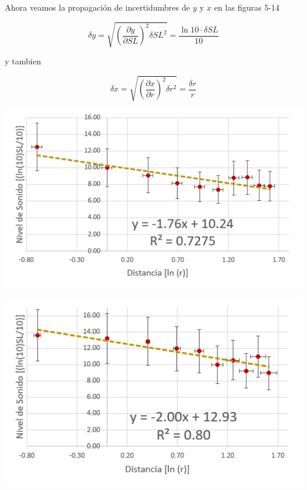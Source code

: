 \documentclass[DIV=calc, paper=a4, fontsize=11pt]{scrartcl}
\newenvironment{Figura}
  {\par\medskip\noindent\minipage{\linewidth}}
  {\endminipage\par\medskip}
\begin{document}
\begin{multicols}{2}
Ahora veamos la propagación de incertidumbres de $y$ y $x$ en las figuras 5-14

\begin{equation*}
    \delta y = \sqrt{\left(\frac{\partial y}{\partial SL}\right)^2 \delta SL^2 } = \frac{\ln{10} \cdot \delta SL}{10}
\end{equation*}

y tambien

\begin{equation*}
    \delta x = \sqrt{\left(\frac{\partial x}{\partial r}\right)^2 \delta r^2} = \frac{\delta r}{r}
\end{equation*}



\begin{Figura}
\centering
    \includegraphics[width=1\textwidth]{grafica 100 Hz.PNG}
    \label{fig}
\end{Figura}

\begin{Figura}
\centering
    \includegraphics[width=1\textwidth]{grafica 200 Hz.PNG}
    \label{fig}
\end{Figura}


\end{multicols}
\end{document}
